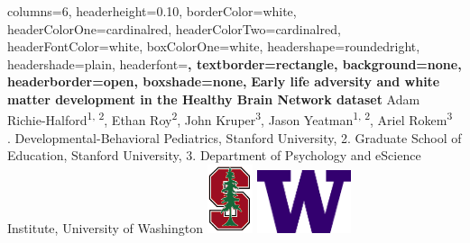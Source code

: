 \documentclass[a0paper,landscape,fontscale=0.385]{baposter}
\begin{document}
\begin{poster}{
    columns=6,
    headerheight=0.10\textheight,
    borderColor=white, %
    headerColorOne=cardinalred, %
    headerColorTwo=cardinalred, %
    headerFontColor=white, %
    boxColorOne=white, %
    headershape=roundedright, %
    headershade=plain, %
    headerfont=\Large\sf\bf, %
    textborder=rectangle,
    background=none,
    headerborder=open, %
    boxshade=none,
}
{}
%
%
{\sf\bf %
Early life adversity and white matter development %
in the Healthy Brain Network dataset
\hfill %
\null %
} %
{%
    \vspace{0.4em}
    Adam Richie-Halford\textsuperscript{1, 2}, %
    Ethan Roy\textsuperscript{2}, %
    John Kruper\textsuperscript{3}, %
    Jason Yeatman\textsuperscript{1, 2}, %
    Ariel Rokem\textsuperscript{3} \hfill \null \\
    {. Developmental-Behavioral Pediatrics, Stanford University, %
        2. Graduate School of Education, Stanford University, %
        3. Department of Psychology and eScience Institute, University of Washington %
        \hfill \null
    }
} %
{%
\includegraphics[align=c,height=2.00cm]{logos/stanford_logo.png}%
\hspace{0.25em}
\includegraphics[align=c,height=1.85cm]{logos/UWlogo.png}%
} %


\end{poster}
\end{document}
